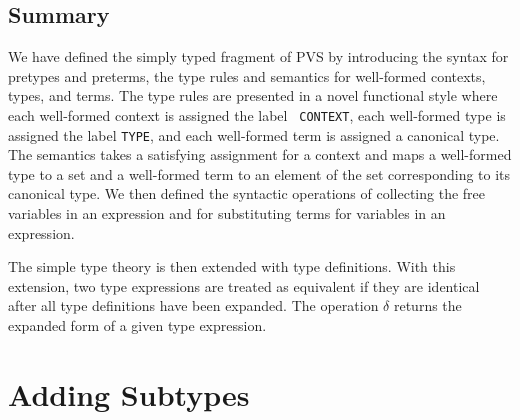 \documentclass [12pt,twoside]{cslreport}
\begin{document}
\section{Summary}

We have defined the simply typed fragment of PVS by introducing the syntax
for pretypes and preterms, the type rules and semantics for well-formed
contexts, types, and terms.  The type rules are presented in a novel
functional style where each well-formed context is assigned the label {\tt
CONTEXT}, each well-formed type is assigned the label {\tt TYPE}, and each
well-formed term is assigned a canonical type.  The semantics takes a
satisfying assignment for a context and maps a well-formed type to a set
and a well-formed term to an element of the set corresponding to its
canonical type.  We then defined the syntactic operations of collecting
the free variables in an expression and for substituting terms for
variables in an expression.

The simple type theory is then extended with type definitions.  With this
extension, two type expressions are treated as equivalent if they are
identical after all type definitions have been expanded.  The operation
$\delta$ returns the expanded form of a given type expression.


\chapter{Adding Subtypes}\label{subtypes}
\end{document}
